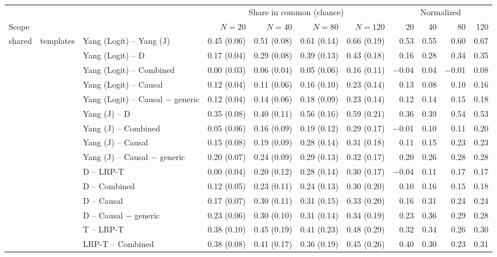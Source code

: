 \begin{tabular}{@{}lllrrrrrrrr@{}}
\toprule
& & & \multicolumn{4}{c}{Share in common (chance)} & \multicolumn{4}{c}{Normalized} \\
\cmidrule(lr){4-7} \cmidrule(lr){8-11}
Scope & & & $N=20$ & $N=40$ & $N=80$ & $N=120$ & 20 & 40 & 80 & 120 \\
\midrule
shared & templates & Yang (Logit) -- Yang (J) & 0.45 (0.06) & 0.51 (0.08) & 0.61 (0.14) & 0.66 (0.19) & 0.53 & 0.55 & 0.60 & 0.67 \\
 &  & Yang (Logit) -- D & 0.17 (0.04) & 0.29 (0.08) & 0.39 (0.13) & 0.43 (0.18) & 0.16 & 0.28 & 0.34 & 0.35 \\
 &  & Yang (Logit) -- Combined & 0.00 (0.03) & 0.06 (0.04) & 0.05 (0.06) & 0.16 (0.11) & $-$0.04 & 0.04 & $-$0.01 & 0.08 \\
 &  & Yang (Logit) -- Causal & 0.12 (0.04) & 0.11 (0.06) & 0.16 (0.10) & 0.23 (0.14) & 0.13 & 0.08 & 0.10 & 0.16 \\
 &  & Yang (Logit) -- Causal $-$ generic & 0.12 (0.04) & 0.14 (0.06) & 0.18 (0.09) & 0.23 (0.14) & 0.12 & 0.14 & 0.15 & 0.18 \\
 &  & Yang (J) -- D & 0.35 (0.08) & 0.40 (0.11) & 0.56 (0.16) & 0.59 (0.21) & 0.36 & 0.39 & 0.54 & 0.53 \\
 &  & Yang (J) -- Combined & 0.05 (0.06) & 0.16 (0.09) & 0.19 (0.12) & 0.29 (0.17) & $-$0.01 & 0.10 & 0.11 & 0.20 \\
 &  & Yang (J) -- Causal & 0.15 (0.08) & 0.19 (0.09) & 0.28 (0.14) & 0.31 (0.18) & 0.11 & 0.15 & 0.23 & 0.23 \\
 &  & Yang (J) -- Causal $-$ generic & 0.20 (0.07) & 0.24 (0.09) & 0.29 (0.13) & 0.32 (0.17) & 0.20 & 0.26 & 0.28 & 0.28 \\
 &  & D -- LRP-T & 0.00 (0.04) & 0.20 (0.12) & 0.28 (0.14) & 0.30 (0.17) & $-$0.04 & 0.11 & 0.17 & 0.17 \\
 &  & D -- Combined & 0.12 (0.05) & 0.23 (0.11) & 0.24 (0.13) & 0.30 (0.20) & 0.10 & 0.16 & 0.15 & 0.18 \\
 &  & D -- Causal & 0.17 (0.07) & 0.30 (0.11) & 0.31 (0.15) & 0.33 (0.20) & 0.16 & 0.31 & 0.24 & 0.24 \\
 &  & D -- Causal $-$ generic & 0.23 (0.06) & 0.30 (0.10) & 0.31 (0.14) & 0.34 (0.19) & 0.23 & 0.36 & 0.29 & 0.28 \\
 &  & T -- LRP-T & 0.38 (0.10) & 0.45 (0.19) & 0.41 (0.23) & 0.48 (0.29) & 0.32 & 0.34 & 0.26 & 0.30 \\
 &  & LRP-T -- Combined & 0.38 (0.08) & 0.41 (0.17) & 0.36 (0.19) & 0.45 (0.26) & 0.40 & 0.30 & 0.23 & 0.31 \\

\end{tabular}
